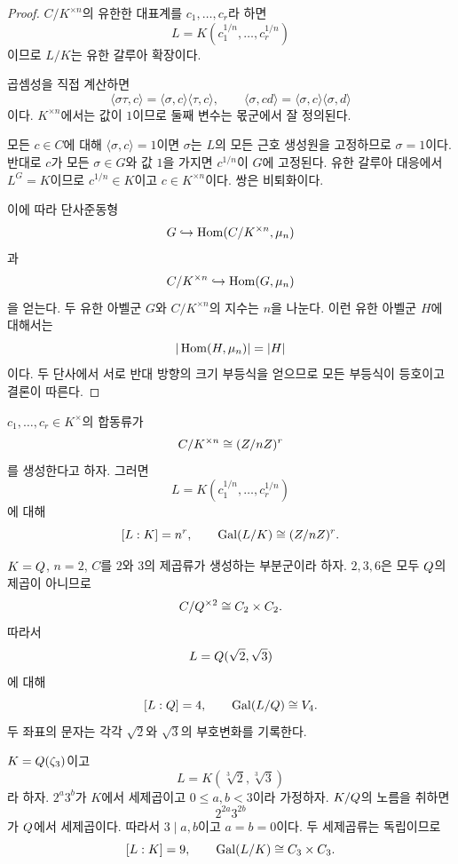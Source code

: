 \begin{proof}
$C/K^{\times n}$의 유한한 대표계를 $c_1,\dots,c_r$라 하면
\[
  L=K(c_1^{1/n},\dots,c_r^{1/n})
\]
이므로 $L/K$는 유한 갈루아 확장이다.

곱셈성을 직접 계산하면
\[
  \langle\sigma\tau,c\rangle
  =\langle\sigma,c\rangle\langle\tau,c\rangle,
  \qquad
  \langle\sigma,cd\rangle
  =\langle\sigma,c\rangle\langle\sigma,d\rangle
\]
이다. $K^{\times n}$에서는 값이 $1$이므로 둘째 변수는 몫군에서 잘 정의된다.

모든 $c\in C$에 대해 $\langle\sigma,c\rangle=1$이면 $\sigma$는 $L$의 모든 근호 생성원을 고정하므로 $\sigma=1$이다. 반대로 $c$가 모든 $\sigma\in G$와 값 $1$을 가지면 $c^{1/n}$이 $G$에 고정된다. 유한 갈루아 대응에서 $L^G=K$이므로 $c^{1/n}\in K$이고 $c\in K^{\times n}$이다. 쌍은 비퇴화이다.

이에 따라 단사준동형
\[
  G\hookrightarrow\operatorname{Hom}(C/K^{\times n},\mu_n)
\]
과
\[
  C/K^{\times n}\hookrightarrow\operatorname{Hom}(G,\mu_n)
\]
을 얻는다. 두 유한 아벨군 $G$와 $C/K^{\times n}$의 지수는 $n$을 나눈다. 이런 유한 아벨군 $H$에 대해서는
\[
  |\operatorname{Hom}(H,\mu_n)|=|H|
\]
이다. 두 단사에서 서로 반대 방향의 크기 부등식을 얻으므로 모든 부등식이 등호이고 결론이 따른다.
\end{proof}

\begin{corollary}[독립인 근호]
\label{cor:independent-radicals}
$c_1,\dots,c_r\in K^\times$의 합동류가
\[
  C/K^{\times n}\cong(Z/nZ)^r
\]
를 생성한다고 하자. 그러면
\[
  L=K(c_1^{1/n},\dots,c_r^{1/n})
\]
에 대해
\[
  [L:K]=n^r,
  \qquad
  \operatorname{Gal}(L/K)\cong(Z/nZ)^r.
\]
\end{corollary}

\begin{example}[이중 이차확장]
$K=Q$, $n=2$, $C$를 $2$와 $3$의 제곱류가 생성하는 부분군이라 하자. $2,3,6$은 모두 $Q$의 제곱이 아니므로
\[
  C/Q^{\times2}\cong C_2\times C_2.
\]
따라서
\[
  L=Q(\sqrt2,\sqrt3)
\]
에 대해
\[
  [L:Q]=4,
  \qquad
  \operatorname{Gal}(L/Q)\cong V_4.
\]
두 좌표의 문자는 각각 $\sqrt2$와 $\sqrt3$의 부호변화를 기록한다.
\end{example}

\begin{example}
$K=Q(\zeta_3)$이고
\[
  L=K(\sqrt[3]{2},\sqrt[3]{3})
\]
라 하자. $2^a3^b$가 $K$에서 세제곱이고 $0\le a,b<3$이라 가정하자. $K/Q$의 노름을 취하면
\[
  2^{2a}3^{2b}
\]
가 $Q$에서 세제곱이다. 따라서 $3\mid a,b$이고 $a=b=0$이다. 두 세제곱류는 독립이므로
\[
  [L:K]=9,
  \qquad
  \operatorname{Gal}(L/K)\cong C_3\times C_3.
\]
\end{example}


